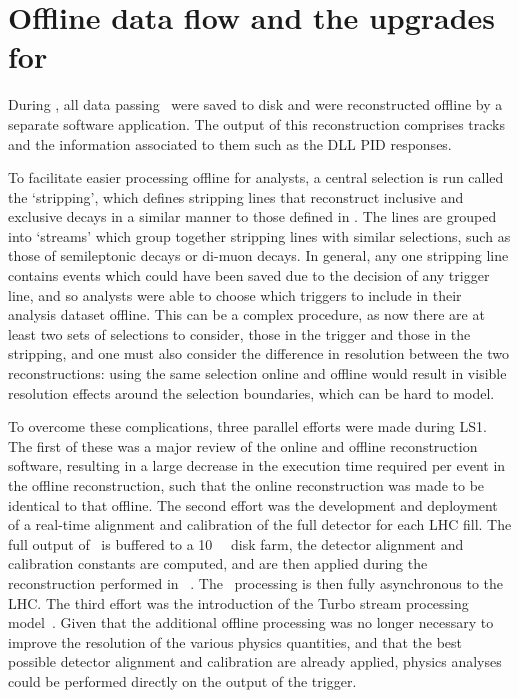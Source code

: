 \section{Offline data flow and the upgrades for \runtwo}
\label{chap:intro:lhcb:offline}

During \runone, all data passing \hlttwo\ were saved to disk and were 
reconstructed offline by a separate software application.
The output of this reconstruction comprises tracks and the information 
associated to them such as the \ac{DLL} \ac{PID} responses.

To facilitate easier processing offline for analysts, a central selection is 
run called the `stripping', which defines stripping lines that reconstruct 
inclusive and exclusive decays in a similar manner to those defined in \hlttwo.
The lines are grouped into `streams' which group together stripping lines with 
similar selections, such as those of semileptonic \PB decays or di-muon decays.
In general, any one stripping line contains events which could have been saved 
due to the decision of any trigger line, and so analysts were able to choose 
which triggers to include in their analysis dataset offline.
This can be a complex procedure, as now there are at least two sets of 
selections to consider, those in the trigger and those in the stripping, and 
one must also consider the difference in resolution between the two 
reconstructions: using the same selection online and offline would result in 
visible resolution effects around the selection boundaries, which can be hard 
to model.

To overcome these complications, three parallel efforts were made during 
\ac{LS1}.
The first of these was a major review of the online and offline reconstruction 
software, resulting in a large decrease in the execution time required per 
event in the offline reconstruction, such that the online reconstruction was 
made to be identical to that offline.
The second effort was the development and deployment of a real-time alignment 
and calibration of the full detector for each \acs{LHC} fill.
The full output of \hltone\ is buffered to a \SI{10}{\peta\byte} disk farm, the 
detector alignment and calibration constants are computed, and are then applied 
during the reconstruction performed in \hlttwo~\cite{Dujany:082010}.
The \hlttwo\ processing is then fully asynchronous to the \ac{LHC}.
The third effort was the introduction of the Turbo stream processing 
model~\cite{Benson:2019752}.
Given that the additional offline processing was no longer necessary to improve 
the resolution of the various physics quantities, and that the best possible 
detector alignment and calibration are already applied, physics analyses could 
be performed directly on the output of the trigger.

